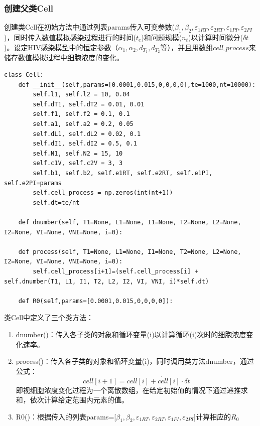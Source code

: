 \documentclass{ctexart}
\begin{document}
\subsubsection{创建父类Cell}
创建类Cell在初始方法中通过列表params传入可变参数($\beta_{1},\beta_{2},\varepsilon _{1RT},\varepsilon _{2RT},\varepsilon _{1PI},\varepsilon _{2PI}$)，同时传入数值模拟感染过程进行的时间($t_{e}$)和问题规模($n_{t}$)以计算时间微分($\delta t$)。设定HIV感染模型中的恒定参数（$\alpha_{1},\alpha_{2},d_{T_{1}},d_{T_{2}}$等），并且用数组$cell\_process$来储存数值模拟过程中细胞浓度的变化。
\begin{lstlisting}[label={lst.1}, caption={父类Cell的参数、初始化条件及类方法}]
    class Cell:
    def __init__(self,params=[0.0001,0.015,0,0,0,0],te=1000,nt=10000):
        self.l1, self.l2 = 10, 0.04
        self.dT1, self.dT2 = 0.01, 0.01
        self.f1, self.f2 = 0.1, 0.1
        self.a1, self.a2 = 0.2, 0.05
        self.dL1, self.dL2 = 0.02, 0.1
        self.dI1, self.dI2 = 0.5, 0.1
        self.N1, self.N2 = 15, 10
        self.c1V, self.c2V = 3, 3
        self.b1, self.b2, self.e1RT, self.e2RT, self.e1PI, self.e2PI=params
        self.cell_process = np.zeros(int(nt+1))
        self.dt=te/nt

    def dnumber(self, T1=None, L1=None, I1=None, T2=None, L2=None, I2=None, VI=None, VNI=None, i=0):

    def process(self, T1=None, L1=None, I1=None, T2=None, L2=None, I2=None, VI=None, VNI=None, i=0):
        self.cell_process[i+1]=(self.cell_process[i] + self.dnumber(T1, L1, I1, T2, L2, I2, VI, VNI, i)*self.dt)

    def R0(self,params=[0.0001,0.015,0,0,0,0]):
\end{lstlisting}
类Cell中定义了三个类方法：
\begin{enumerate}
    \item dnumber()：传入各子类的对象和循环变量(i)以计算循环(i)次时的细胞浓度变化速率。
    \item process()：传入各子类的对象和循环变量(i)，同时调用类方法dnumber，通过公式：$$cell[i+1]=cell[i]+\dot{cell}[i]\cdot \delta t$$即视细胞浓度变化过程为一个离散数组，在给定初始值的情况下通过递推求和，依次计算给定范围内元素的值。
    \item R0()：根据传入的列表params=[$\beta_{1},\beta_{2},\varepsilon _{1RT},\varepsilon _{2RT},\varepsilon _{1PI},\varepsilon _{2PI}$]计算相应的$R_{0}$
\end{enumerate}
\end{document}
